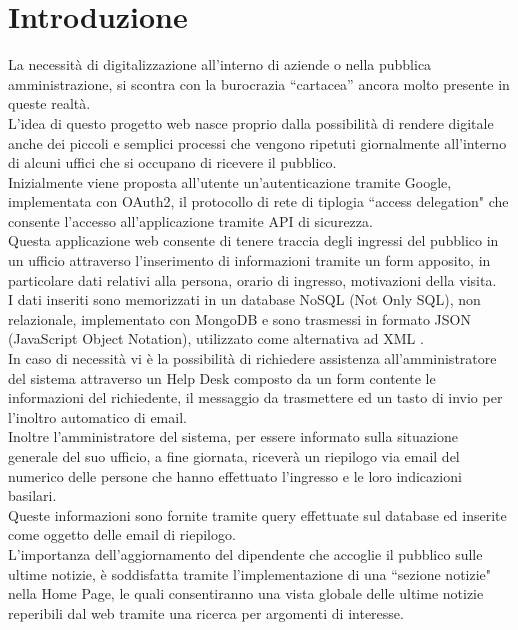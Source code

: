 \section{Introduzione}
\label{sec:capitolo}
\vspace{0.4 em}
\begin{flushleft}
La necessità di digitalizzazione all’interno di aziende o nella pubblica amministrazione, si scontra con la burocrazia “cartacea” ancora molto presente in queste realtà.\\ 
L’idea di questo progetto web nasce proprio dalla possibilità di rendere digitale anche dei piccoli e semplici processi che vengono ripetuti giornalmente all’interno di alcuni uffici che si occupano di ricevere il pubblico. \\
Inizialmente viene proposta all'utente un'autenticazione tramite Google, implementata con OAuth2, il protocollo di rete di tiplogia “access delegation" che consente l'accesso all'applicazione tramite API di sicurezza.\\ 
Questa applicazione web consente di tenere traccia degli ingressi del pubblico in un ufficio attraverso l'inserimento di informazioni tramite un form apposito, in particolare dati relativi alla persona, orario di ingresso, motivazioni della visita.\\ 
I dati inseriti sono memorizzati in un database NoSQL (Not Only SQL), non relazionale, implementato con MongoDB e sono trasmessi in formato JSON (JavaScript Object Notation), utilizzato come alternativa ad XML .\\
In caso di necessità vi è la possibilità di richiedere assistenza all'amministratore del sistema attraverso un Help Desk composto da un form contente le informazioni del richiedente, il messaggio da trasmettere ed un tasto di invio per l’inoltro automatico di email.\\
Inoltre l’amministratore del sistema, per essere informato sulla situazione generale del suo ufficio, a fine giornata, riceverà un riepilogo via email del numerico delle persone che hanno effettuato l’ingresso e le loro indicazioni basilari.\\
Queste informazioni sono fornite tramite query effettuate sul database ed inserite come oggetto delle email di riepilogo.\\
L'importanza dell’aggiornamento del dipendente che accoglie il pubblico sulle ultime notizie, è soddisfatta tramite l'implementazione di una “sezione notizie" nella Home Page, le quali consentiranno una vista globale delle ultime notizie reperibili dal web tramite una ricerca per argomenti di interesse.
\end{flushleft}
 


